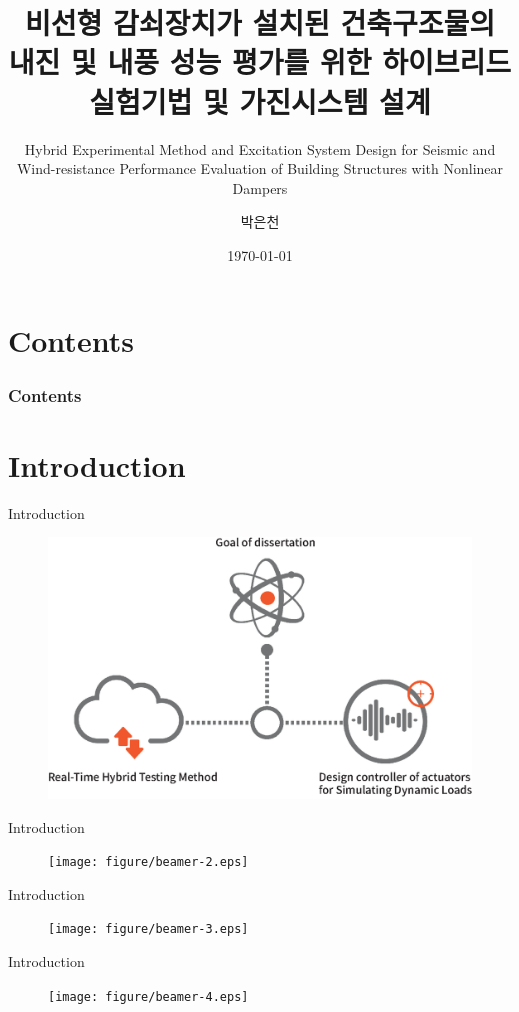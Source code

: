 \documentclass[usepdftitle=false]{beamer}
\title{비선형 감쇠장치가 설치된 건축구조물의 내진 및 내풍 성능 평가를 위한 하이브리드 실험기법 및 가진시스템 설계}
\subtitle{Hybrid Experimental Method and Excitation System Design for Seismic and Wind-resistance Performance Evaluation of Building Structures with Nonlinear Dampers}
\author{박은천}
\institute{단국대학교 건축대학 {\Medium 지도교수 : 민경원}}
\date{\today}
\begin{document}
\maketitle

\section*{Contents}
\begin{frame}
	\frametitle{Contents}
	\tableofcontents[hideallsubsections]
\end{frame}

\section{Introduction}

\begin{frame}{Introduction}
\begin{figure}[ht]
\centering
\includegraphics[width=1\textwidth] {figure/beamer-1.eps}
\end{figure}
\end{frame}

\begin{frame}{Introduction}
\begin{figure}[ht]
\centering
\texttt{[image: figure/beamer-2.eps]}
\end{figure}
\end{frame}

\begin{frame}{Introduction}
\begin{figure}[ht]
\centering
\texttt{[image: figure/beamer-3.eps]}
\end{figure}
\end{frame}

\begin{frame}{Introduction}
\begin{figure}[ht]
\centering
\texttt{[image: figure/beamer-4.eps]}
\end{figure}
\end{frame}
\end{document}
